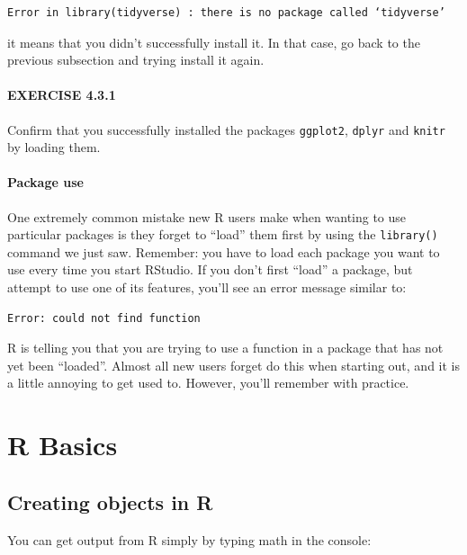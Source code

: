 \documentclass[
]{book}
\begin{document}
\begin{verbatim}
Error in library(tidyverse) : there is no package called ‘tidyverse’
\end{verbatim}

it means that you didn't successfully install it. In that case, go back to the previous subsection and trying install it again.

\subsubsection*{EXERCISE 4.3.1}\label{exercise-4.3.1}

Confirm that you successfully installed the packages \texttt{ggplot2}, \texttt{dplyr} and \texttt{knitr} by loading them.

\subsubsection*{Package use}\label{package-use}

One extremely common mistake new R users make when wanting to use particular packages is they forget to ``load'' them first by using the \texttt{library()} command we just saw. Remember: you have to load each package you want to use every time you start RStudio. If you don't first ``load'' a package, but attempt to use one of its features, you'll see an error message similar to:

\begin{verbatim}
Error: could not find function
\end{verbatim}

R is telling you that you are trying to use a function in a package that has not yet been ``loaded''. Almost all new users forget do this when starting out, and it is a little annoying to get used to. However, you'll remember with practice.

\chapter{R Basics}\label{r-basics}

\section{Creating objects in R}\label{creating-objects-in-r}

You can get output from R simply by typing math in the console:
\end{document}
